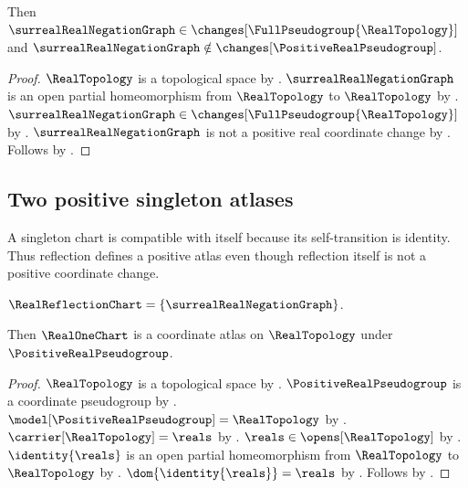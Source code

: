 \begin{theorem}\label{real_reflection_distinguishes_pseudogroups}
    Then $\surrealRealNegationGraph\in\changes[\FullPseudogroup{\RealTopology}]$ and
        $\surrealRealNegationGraph\notin\changes[\PositiveRealPseudogroup]$.
\end{theorem}
\begin{proof}
    $\RealTopology$ is a topological space by .
    $\surrealRealNegationGraph$ is an open partial homeomorphism from $\RealTopology$
        to $\RealTopology$ by .
    $\surrealRealNegationGraph\in\changes[\FullPseudogroup{\RealTopology}]$ by
        .
    $\surrealRealNegationGraph$ is not a positive real coordinate change by
        .
    Follows by .
\end{proof}

\subsection{Two positive singleton atlases}

A singleton chart is compatible with itself because its self-transition is
identity. Thus reflection defines a positive atlas even though reflection
itself is not a positive coordinate change.

\begin{definition}\label{real_reflection_chart}
    $\RealReflectionChart=\{\surrealRealNegationGraph\}$.
\end{definition}

\begin{classification}\label{real_identity_positive_atlas}
    Then $\RealOneChart$ is a coordinate atlas on $\RealTopology$ under
        $\PositiveRealPseudogroup$.
\end{classification}
\begin{proof}
    $\RealTopology$ is a topological space by .
    $\PositiveRealPseudogroup$ is a coordinate pseudogroup by .
    $\model[\PositiveRealPseudogroup]=\RealTopology$ by
        .
    $\carrier[\RealTopology]=\reals$ by .
    $\reals\in\opens[\RealTopology]$ by .
    $\identity{\reals}$ is an open partial homeomorphism from $\RealTopology$ to
        $\RealTopology$ by .
    $\dom{\identity{\reals}}=\reals$ by .
    Follows by .
\end{proof}


